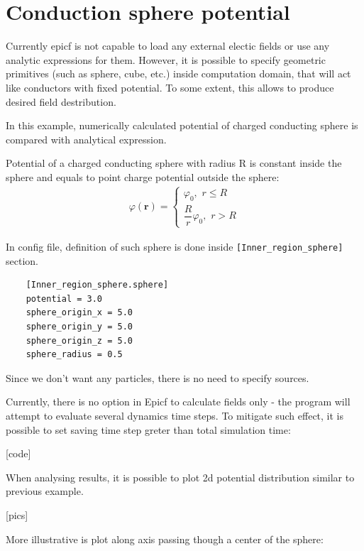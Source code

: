 \section{Conduction sphere potential}
Currently epicf is not capable to load any external electic fields or
use any analytic expressions for them.  However, it is possible to
specify geometric primitives (such as sphere, cube, etc.) inside
computation domain, that will act like conductors with fixed
potential. To some extent, this allows to produce desired field
destribution.

In this example, numerically calculated potential of charged
conducting sphere is compared with analytical expression.

Potential of a charged conducting sphere with radius R is constant
inside the sphere and equals to point charge potential outside the
sphere:
\begin{gather}
  \varphi( \mathbf{r} )
  = 
  \begin{cases}
    \varphi_0, \,\, r \le R \\
    \dfrac{R}{r} \varphi_0, \,\, r > R
  \end{cases}
\end{gather}

In config file, definition of such sphere is done inside
\texttt{[Inner\_region\_sphere]} section.

\begin{verbatim}
    [Inner_region_sphere.sphere]
    potential = 3.0
    sphere_origin_x = 5.0
    sphere_origin_y = 5.0
    sphere_origin_z = 5.0
    sphere_radius = 0.5
\end{verbatim}

Since we don't want any particles, there is no need to specify
sources.

Currently, there is no option in Epicf to calculate fields only - the
program will attempt to evaluate several dynamics time steps. To
mitigate such effect, it is possible to set saving time step greter
than total simulation time:

[code]

When analysing results, it is possible to plot 2d potential
distribution similar to previous example.  

[pics]

More illustrative is plot along axis passing though a center of the
sphere:

